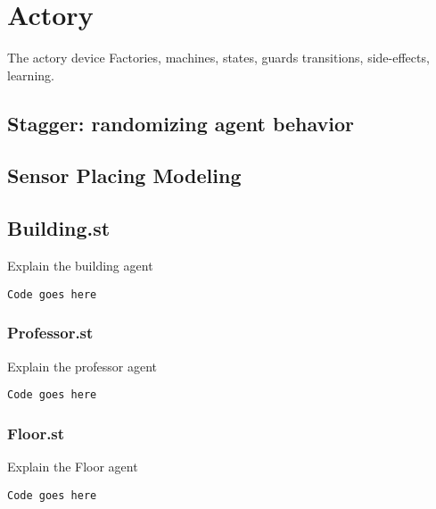 \section{Actory} 

The actory device
Factories, machines, states, guards transitions, side-effects, learning.

\subsection{Stagger: randomizing agent behavior}

\subsection{Sensor Placing Modeling}

\subsection{Building.st}
Explain the building agent
\begin{footnotesize}
\begin{verbatim}
Code goes here
\end{verbatim}
\end{footnotesize}


\subsubsection{Professor.st}
Explain the professor agent
\begin{footnotesize}
\begin{verbatim}
Code goes here
\end{verbatim}
\end{footnotesize}


\subsubsection{Floor.st}
Explain the Floor agent
\begin{footnotesize}
\begin{verbatim}
Code goes here
\end{verbatim}
\end{footnotesize}


